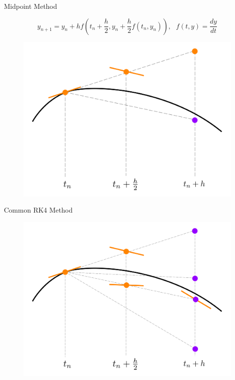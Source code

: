 \documentclass{beamer}
\begin{document}

\usebackgroundtemplate{}
\begin{frame}{Midpoint Method}

$$y_{n+1}=y_n+h f \left ( t_n+\frac{h}{2}, y_n+ \frac{h}{2} f(t_n,y_n) \right ), \:\:\: f(t,y) = \frac{dy}{dt}$$

\begin{figure}[h!]
  \centering
    \includegraphics[height=0.7\textheight]{midpoint_diagram.png}
\end{figure}

\end{frame}


\usebackgroundtemplate{}
\begin{frame}{Common RK4 Method}

\begin{figure}[h!]
  \centering
    \includegraphics[width=\textwidth]{rk4_diagram.png}
\end{figure}

\end{frame}
\end{document}
